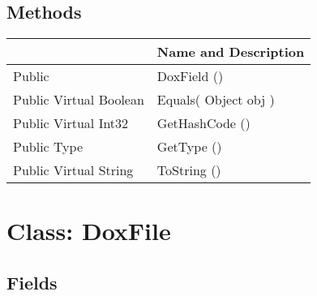 \documentclass[11pt, oneside, a4paper]{book}
\begin{document}
\subsection{Methods}
\begin{center}
\begin{tabular}{| p{3cm} | p{12cm} | }
\hline
\textbf{ } & \textbf{ Name and Description}\\
\hline
 Public  &  DoxField ()\hypertarget{SoftwareEngineeringTools.{}Documentation.{}DoxField.{}DoxField}{}\\
\hline
 Public  Virtual  Boolean &  Equals(\hypertarget{SoftwareEngineeringTools.{}Documentation.{}DoxField.{}Equals\_Object}{} Object  obj  )\\
\hline
 Public  Virtual  Int32 &  GetHashCode ()\hypertarget{SoftwareEngineeringTools.{}Documentation.{}DoxField.{}GetHashCode}{}\\
\hline
 Public  Type &  GetType ()\hypertarget{SoftwareEngineeringTools.{}Documentation.{}DoxField.{}GetType}{}\\
\hline
 Public  Virtual  String &  ToString ()\hypertarget{SoftwareEngineeringTools.{}Documentation.{}DoxField.{}ToString}{}\\
\hline
\end{tabular}
\end{center}
 


\hypertarget{SoftwareEngineeringTools.{}Documentation.{}DoxFile}{}
\section{Class: DoxFile}

\subsection{Fields}
\end{document}
